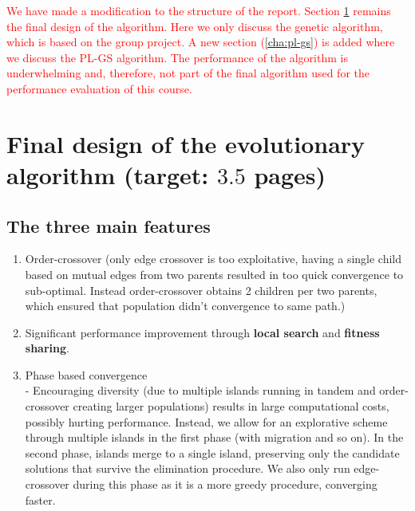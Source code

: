 \documentclass[a4paper,10pt]{article}
\def\retake{0}
\newcommand{\switch}[2]{\ifnum\retake=0{#1}\else{#2}\fi}
\newcommand{\ReplaceMe}[1]{{\color{blue}#1}}
\newcommand{\RemoveMe}[1]{{\color{purple}#1}}
\begin{document}
	\textcolor{red}{
		We have made a modification to the structure of the report. Section \ref{cha:final_design} remains the final design of the algorithm. Here we only discuss the genetic algorithm, which is based on the group project. A new section (\ref{cha:pl-gs}) is added where we discuss the PL-GS algorithm. The performance of the algorithm is underwhelming and, therefore, not part of the final algorithm used for the performance evaluation of this course.
	}


\section{Final design of the evolutionary algorithm (target: $3.5$ pages)} \label{cha:final_design}


\subsection{The three main features}

	\begin{enumerate}
	\item Order-crossover (only edge crossover is too exploitative, having a single child based on mutual edges from two parents resulted in too quick convergence to sub-optimal. Instead order-crossover obtains 2 children per two parents, which ensured that population didn't convergence to same path.)
	\item Significant performance improvement through \textbf{local search} and \textbf{fitness sharing}.
	\item Phase based convergence \\
		- Encouraging diversity (due to multiple islands running in tandem and order-crossover creating larger populations) results in large computational costs, possibly hurting performance. Instead, we allow for an explorative scheme through multiple islands in the first phase (with migration and so on). In the second phase, islands merge to a single island, preserving only the candidate solutions that survive the elimination procedure. We also only run edge-crossover during this phase as it is a more greedy procedure, converging faster.
	\end{enumerate}
	
\end{document}
